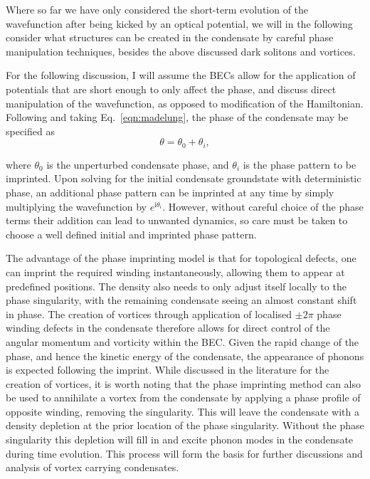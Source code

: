 {%
Where so far we have only considered the short-term evolution of the wavefunction after being kicked by an optical potential, we will in the following consider what structures can be created in the condensate by careful phase manipulation techniques, besides the above discussed dark solitons and vortices.

For the following discussion, I will assume the BECs allow for the application of potentials that are short enough to only affect the phase, and discuss direct manipulation of the wavefunction, as opposed to modification of the Hamiltonian. Following \cite{BK:Pitaevskii_Stringari_2003} and taking Eq.~\eqref{eqn:madelung}, the phase of the condensate may be specified as
\begin{equation}
\theta = \theta_0 + \theta_i,
\end{equation}

where $\theta_0$ is the unperturbed condensate phase, and $\theta_i$ is the phase pattern to be imprinted. Upon solving for the initial condensate groundstate with deterministic phase, an additional phase pattern can be imprinted at any time by simply multiplying the wavefunction by $e^{\text{i}\theta_i}$. However, without careful choice of the phase terms their addition can lead to unwanted dynamics, so care must be taken to choose a well defined initial and imprinted phase pattern.

The advantage of the phase imprinting model is that for topological defects, one can imprint the required winding instantaneously, allowing them to appear at predefined positions. The density also needs to only adjust itself locally to the phase singularity, with the remaining condensate seeing an almost constant shift in phase. The creation of vortices through application of localised $\pm 2\pi$ phase winding defects in the condensate therefore allows for direct control of the angular momentum and vorticity within the BEC. Given the rapid change of the phase, and hence the kinetic energy of the condensate, the appearance of phonons is expected following the imprint. While discussed in the literature for the creation of vortices, it is worth noting that the phase imprinting method can also be used to annihilate a vortex from the condensate by applying a phase profile of opposite winding, removing the singularity. This will leave the condensate with a density depletion at the prior location of the phase singularity. Without the phase singularity this depletion will fill in and excite phonon modes in the condensate during time evolution. This process will form the basis for further discussions and analysis of vortex carrying condensates.

}
